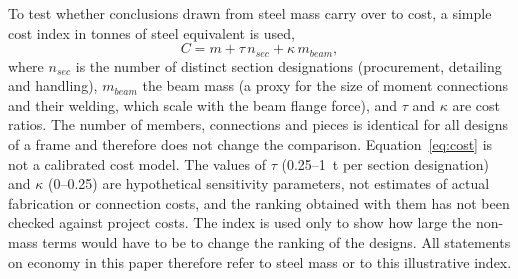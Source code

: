 To test whether conclusions drawn from steel mass carry over to cost, a simple cost index in
tonnes of steel equivalent is used,
\begin{equation}
C = m + \tau\, n_{sec} + \kappa\, m_{beam},
\label{eq:cost}
\end{equation}
where $n_{sec}$ is the number of distinct section designations (procurement, detailing and
handling), $m_{beam}$ the beam mass (a proxy for the size of moment connections and their welding,
which scale with the beam flange force), and $\tau$ and $\kappa$ are cost ratios. The number of
members, connections and pieces is identical for all designs of a frame and therefore does not
change the comparison. Equation~\eqref{eq:cost} is not a calibrated cost model. The values of $\tau$ (0.25--1~t per
section designation) and $\kappa$ (0--0.25) are hypothetical sensitivity parameters, not estimates
of actual fabrication or connection costs, and the ranking obtained with them has not been checked
against project costs. The index is used only to show how large the non-mass terms would have to be
to change the ranking of the designs. All statements on economy in this paper therefore refer to
steel mass or to this illustrative index.

